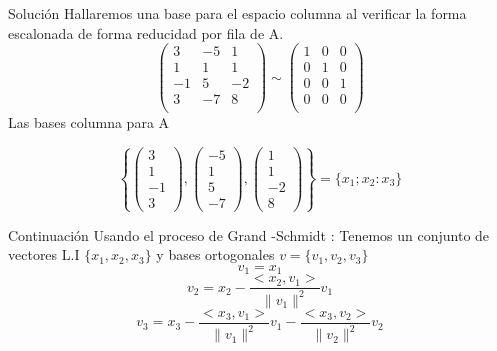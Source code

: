\documentclass[11pt]{beamer}
\begin{document}
\begin{frame}{Solución}
    Hallaremos una base para el espacio columna al verificar la forma escalonada de forma reducidad por fila de A.
    \begin{equation*}
        \begin{pmatrix}
        3 & -5 & 1\\
        1 & 1 & 1 \\ 
        -1 & 5 & -2 \\
        3 & -7 & 8 \\
    \end{pmatrix}
    \sim 
    \begin{pmatrix}
        1 & 0 & 0\\
        0 & 1 & 0 \\ 
        0 & 0 & 1 \\
        0 & 0 & 0 \\
    \end{pmatrix}
    \end{equation*}
    Las bases columna para A 
    
    \begin{equation*}
    \left \{
        \begin{pmatrix}
            3 \\ 1 \\ -1 \\ 3
        \end{pmatrix} , 
        \begin{pmatrix}
            -5 \\ 1 \\ 5 \\ -7
        \end{pmatrix} , 
        \begin{pmatrix}
            1 \\ 1 \\ -2 \\ 8 
        \end{pmatrix}
        \right\} 
         = 
         \{
        x_1 ; x_2 : x_3
         \}
    \end{equation*}
\end{frame}

\begin{frame}{Continuación}
Usando el proceso de Grand -Schmidt :
Tenemos un conjunto de vectores L.I $\{ x_1 , x_2 , x_3 \}$ y bases ortogonales  $ v = \{ v_1 , v_2 , v_3 \} $
\begin{equation*}
    v_1 = x_1  
\end{equation*}
\begin{equation*}
v_2 = x_2 - \frac{<x_2,v_1>}{\parallel v_1 \parallel ^2} v_1    
\end{equation*}
\begin{equation*}
    v_3 = x_3 - \frac{<x_3,v_1>}{\parallel v_1 \parallel ^2} v_1 - \frac{<x_3,v_2>}{\parallel v_2 \parallel ^2} v_2
\end{equation*}

\end{frame}
\end{document}

